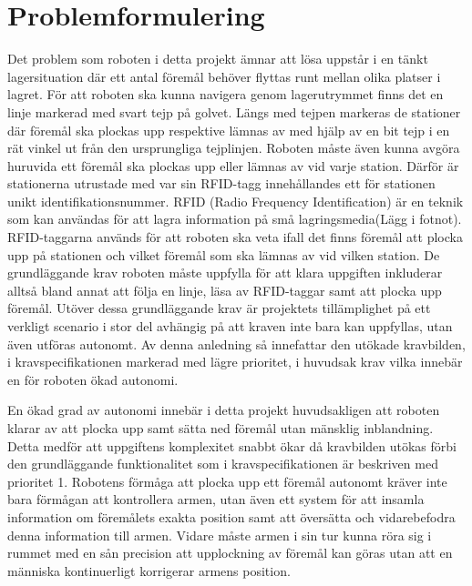 

\section{Problemformulering}

Det problem som roboten i detta projekt ämnar att lösa uppstår i en tänkt lagersituation där ett antal föremål behöver flyttas runt mellan olika platser i lagret. För att roboten ska kunna navigera genom lagerutrymmet finns det en linje markerad med svart tejp på golvet. Längs med tejpen markeras de stationer där föremål ska plockas upp respektive lämnas av med hjälp av en bit tejp i en rät vinkel ut från den ursprungliga tejplinjen.
Roboten måste även kunna avgöra huruvida ett föremål ska plockas upp eller lämnas av vid varje station. Därför är stationerna utrustade med var sin RFID-tagg innehållandes ett för stationen unikt identifikationsnummer. RFID (Radio Frequency Identification) är en teknik som kan användas för att lagra information på små lagringsmedia(Lägg i fotnot). RFID-taggarna används för att roboten ska veta ifall det finns föremål att plocka upp på stationen och vilket föremål som ska lämnas av vid vilken station.
De grundläggande krav roboten måste uppfylla för att klara uppgiften inkluderar alltså bland annat att följa en linje, läsa av RFID-taggar samt att plocka upp föremål. Utöver dessa grundläggande krav är projektets tillämplighet på ett verkligt scenario i stor del avhängig på att kraven inte bara kan uppfyllas, utan även utföras autonomt. Av denna anledning så innefattar den utökade kravbilden, i kravspecifikationen markerad med lägre prioritet, i huvudsak krav vilka innebär en för roboten ökad autonomi.

En ökad grad av autonomi innebär i detta projekt huvudsakligen att roboten klarar av att plocka upp samt sätta ned föremål utan mänsklig inblandning. Detta medför att uppgiftens komplexitet snabbt ökar då kravbilden utökas förbi den grundläggande funktionalitet som i kravspecifikationen är beskriven med prioritet 1. Robotens förmåga att plocka upp ett föremål autonomt kräver inte bara förmågan att kontrollera armen, utan även ett system för att insamla information om föremålets exakta position samt att översätta och vidarebefodra denna information till armen. Vidare måste armen i sin tur kunna röra sig i rummet med en sån precision att upplockning av föremål kan göras utan att en människa kontinuerligt korrigerar armens position.
